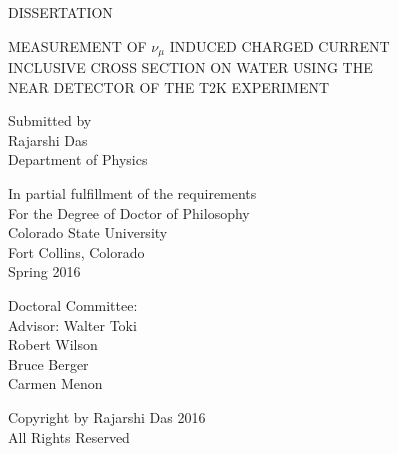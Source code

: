 \thispagestyle{empty}
\begin{center}
DISSERTATION\\

\bigskip
\bigskip
\bigskip
\bigskip
\bigskip

MEASUREMENT OF $\nu_\mu$ INDUCED CHARGED CURRENT\\ 
INCLUSIVE CROSS SECTION ON WATER USING THE\\
NEAR DETECTOR OF THE T2K EXPERIMENT\\

\bigskip
\bigskip
\bigskip
\bigskip
\bigskip

Submitted by\\
Rajarshi Das\\
Department of Physics\\

\bigskip
\bigskip
\bigskip
\bigskip
\bigskip

In partial fulfillment of the requirements\\
For the Degree of Doctor of Philosophy\\
Colorado State University\\
Fort Collins, Colorado\\
Spring 2016
\end{center}

\bigskip
\bigskip
\bigskip
\bigskip

\singlespacing
\noindent Doctoral Committee:\\

\indent Advisor: Walter Toki\\

\indent Robert Wilson\\
\indent Bruce Berger\\
\indent Carmen Menon\\


\newpage

\thispagestyle{empty}
\vspace*{\fill}
\doublespacing
\begin{center}
Copyright by Rajarshi Das 2016\\
All Rights Reserved
\end{center}
\vspace*{\fill}

\newpage
{}


